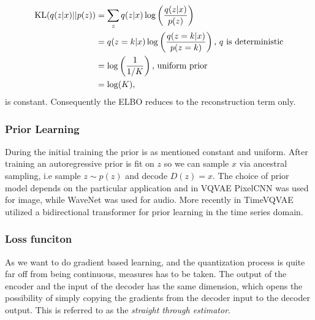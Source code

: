 \documentclass[../../thesis.tex]{subfiles}
\begin{document}
\begin{equation}
    \begin{aligned}
        \operatorname*{\mathrm{KL}}(q(z|x)||p(z)) &= \sum_{z}  q(z|x) \log \left(\frac{q(z|x)}{p(z)}\right) \\
                           &= q(z=k|x) \log \left(\frac{q(z=k|x)}{p(z=k)}\right) \text{, $q$ is deterministic}\\
                           &= \log \left(\frac{1}{1/K}\right) \text{, uniform prior}\\
                           &= \log(K), 
    \end{aligned}
\end{equation}
is constant. Consequently the ELBO reduces to the reconstruction term only. \newline



\subsubsection{Prior Learning}
During the initial training the prior is as mentioned constant and uniform. After training an autoregressive prior is fit on $z$ so we can sample $x$ via ancestral sampling, i.e sample $z \sim p(z)$ and decode $D(z) = x$. The choice of prior model depends on the particular application and in VQVAE PixelCNN \cite{oord2016pixel} was used for image, while WaveNet \cite{oord2016wavenet} was used for audio. More recently in TimeVQVAE \cite{TimeVQVAE} utilized a bidirectional transformer \cite{chang2022maskgit} for prior learning in the time series domain. 

\subsubsection{Loss funciton}
As we want to do gradient based learning, and the quantization process is quite far off from being continuous, measures has to be taken. The output of the encoder and the input of the decoder has the same dimension, which opens the possibility of simply copying the gradients from the decoder input to the decoder output. This is referred to as the \textit{straight through estimator}.\newline
\end{document}
